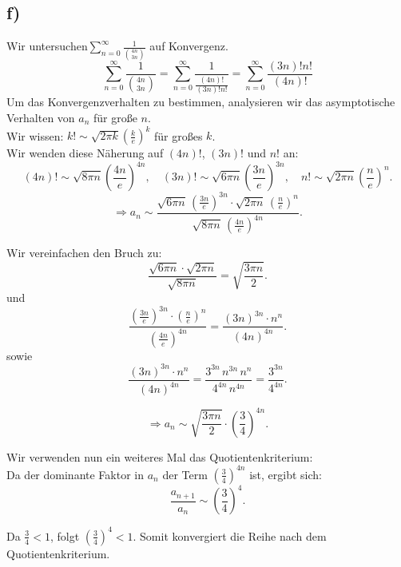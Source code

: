     \subsection{f)}
        Wir untersuchen$\sum_{n=0}^{\infty} \frac{1}{\binom{4n}{3n}}$ auf Konvergenz.
        $$ \sum_{n=0}^{\infty} \frac{1}{\binom{4n}{3n}} = \sum_{n=0}^{\infty} \frac{1}{\frac{(4n)!}{(3n)!n!}}=\sum_{n=0}^{\infty} \frac{(3n)!n!}{(4n)!}$$
        Um das Konvergenzverhalten zu bestimmen, analysieren wir das asymptotische Verhalten von \(a_n\) für große \(n\). \\
        Wir wissen: $k! \sim \sqrt{2\pi k} \left( \frac{k}{e} \right)^k$ für großes $k$. \\
        Wir wenden diese Näherung auf \( (4n)! \), \( (3n)! \) und \( n! \) an:
        \[
        (4n)! \sim \sqrt{8\pi n} \left( \frac{4n}{e} \right)^{4n}, \quad (3n)! \sim \sqrt{6\pi n} \left( \frac{3n}{e} \right)^{3n}, \quad n! \sim \sqrt{2\pi n} \left( \frac{n}{e} \right)^n.
        \]
        \[
        \Rightarrow a_n \sim \frac{\sqrt{6\pi n} \, \left( \frac{3n}{e} \right)^{3n} \cdot \sqrt{2\pi n} \, \left( \frac{n}{e} \right)^n}{\sqrt{8\pi n} \, \left( \frac{4n}{e} \right)^{4n}}.
        \]

        Wir vereinfachen den Bruch zu:
        \[
        \frac{\sqrt{6\pi n} \cdot \sqrt{2\pi n}}{\sqrt{8\pi n}} = \sqrt{\frac{3\pi n}{2}}.
        \]
        und
        \[
        \frac{\left( \frac{3n}{e} \right)^{3n} \cdot \left( \frac{n}{e} \right)^n}{\left( \frac{4n}{e} \right)^{4n}} = \frac{(3n)^{3n} \cdot n^n}{(4n)^{4n}}.
        \]
        sowie
        \[
        \frac{(3n)^{3n} \cdot n^n}{(4n)^{4n}} = \frac{3^{3n} \, n^{3n} \, n^n}{4^{4n} \, n^{4n}} = \frac{3^{3n}}{4^{4n}}.
        \]

        \[
        \Rightarrow a_n \sim \sqrt{\frac{3\pi n}{2}} \cdot \left( \frac{3}{4} \right)^{4n}.
        \]
        
        Wir verwenden nun ein weiteres Mal das Quotientenkriterium: \\                
        Da der dominante Faktor in \(a_n\) der Term \(\left( \frac{3}{4} \right)^{4n}\) ist, ergibt sich:
        \[
        \frac{a_{n+1}}{a_n} \sim \left( \frac{3}{4} \right)^4.
        \]
        
        Da \( \frac{3}{4} < 1 \), folgt \( \left( \frac{3}{4} \right)^4 < 1 \). Somit konvergiert die Reihe nach dem Quotientenkriterium.
    